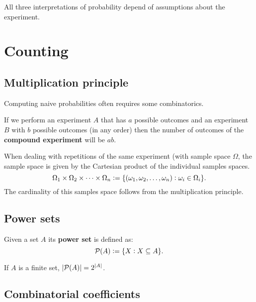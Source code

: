 \begin{remark}
    All three interpretations of probability depend of assumptions about the experiment.
\end{remark}


\section{Counting}
\subsection{Multiplication principle}
Computing naive probabilities often requires some combinatorics.

\begin{definition}
    If we perform an experiment $A$ that has $a$ possible outcomes and an experiment $B$ with $b$ possible outcomes (in any order) then the number of outcomes of the  \textbf{compound experiment} will be $ab$.
\end{definition}

\begin{remark}
    When dealing with repetitions of the same experiment (with sample space $\Omega$, the sample space is given by the Cartesian product of the individual samples spaces.
    \[
        \Omega_1 \times \Omega_2 \times \cdots \times \Omega_n :=  \{(\omega_1,\omega_2,\ldots,\omega_n): \omega_i \in \Omega_i\}\textcolor{black}{.}
    \]
    The cardinality of this samples space follows from the multiplication principle.
\end{remark}

\subsection{Power sets}
\begingroup\belowdisplayskip=-10pt
    \begin{definition}
        Given a set $A$ its \textbf{power set} is defined as:
        \[
            \mathcal{P}(A) := \{X:X\subseteq A\}\textcolor{black}{.}
        \]
    \end{definition}
\endgroup

\begin{theorem}
    If $A$ is a finite set, $|\mathcal{P}(A)|=2^{|A|}$.
\end{theorem}

\subsection{Combinatorial coefficients}

